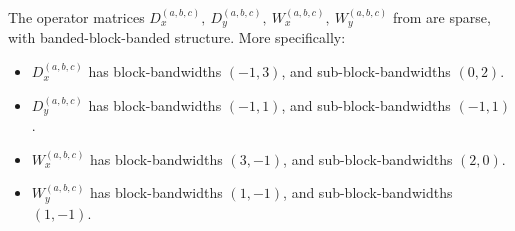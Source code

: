 \begin{theorem}\label{theorem:ds:sparsityofdifferentialoperators}
	The operator matrices $D_x^{(a,b,c)}, \: D_y^{(a,b,c)}, \: W_x^{(a,b,c)}, \: W_y^{(a,b,c)}$ from  are sparse, with banded-block-banded structure. More specifically:
\begin{itemize}
	\item $D_x^{(a,b,c)}$ has  block-bandwidths $(-1,3)$, and sub-block-bandwidths $(0, 2)$.
  	\item $D_y^{(a,b,c)}$ has  block-bandwidths $(-1,1)$, and sub-block-bandwidths $(-1,1)$.
	\item $W_x^{(a,b,c)}$ has  block-bandwidths $(3,-1)$, and sub-block-bandwidths $(2, 0)$.
  	\item $W_y^{(a,b,c)}$ has  block-bandwidths $(1,-1)$, and sub-block-bandwidths $(1,-1)$.
\end{itemize}
\end{theorem}

